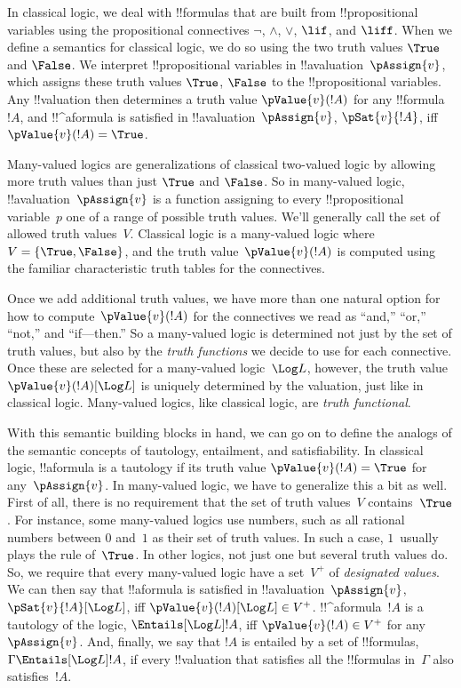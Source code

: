 \documentclass[../../../include/open-logic-section]{subfiles}
\begin{document}


In classical logic, we deal  with !!{formula}s that are built from
!!{propositional variable}s using the propositional connectives
$\lnot$, $\land$, $\lor$, $\lif$, and $\liff$.  When we define a
semantics for classical logic, we do so using the two truth values
$\True$ and $\False$.  We interpret !!{propositional variable}s in
!!a{valuation}~$\pAssign{v}$, which assigns these truth values
$\True$, $\False$ to the !!{propositional variable}s. Any
!!{valuation} then determines a truth value $\pValue{v}(!A)$ for any
!!{formula}~$!A$, and !!^a{formula} is satisfied in
!!a{valuation}~$\pAssign{v}$, $\pSat{v}{!A}$, iff $\pValue{v}(!A) =
\True$.

Many-valued logics are generalizations of classical two-valued logic
by allowing more truth values than just $\True$ and $\False$. So in
many-valued logic, !!a{valuation}~$\pAssign{v}$ is a function
assigning to every !!{propositional variable}~$p$ one of a range of
possible truth values.  We'll generally call the set of allowed truth
values~$V$.  Classical logic is a many-valued logic where $V =
\{\True, \False\}$, and the truth value~$\pValue{v}(!A)$ is computed
using the familiar characteristic truth tables for the connectives.

Once we add additional truth values, we have more than one natural
option for how to compute~$\pValue{v}(!A)$ for the connectives we read
as ``and,'' ``or,'' ``not,'' and ``if---then.''  So a many-valued
logic is determined not just by the set of truth values, but also by
the \emph{truth functions} we decide to use for each connective.  Once
these are selected for a many-valued logic~$\Log L$, however, the
truth value $\pValue{v}(!A)[\Log L]$ is uniquely determined by the
valuation, just like in classical logic. Many-valued logics, like
classical logic, are \emph{truth functional}.

With this semantic building blocks in hand, we can go on to define the
analogs of the semantic concepts of tautology, entailment, and
satisfiability.  In classical logic, !!a{formula} is a tautology if
its truth value $\pValue{v}(!A) = \True$ for any~$\pAssign{v}$.  In
many-valued logic, we have to generalize this a bit as well. First of
all, there is no requirement that the set of truth values~$V$
contains~$\True$. For instance, some many-valued logics use numbers,
such as all rational numbers between $0$ and~$1$ as their set of truth
values.  In such a case, $1$~usually plays the rule of~$\True$. In
other logics, not just one but several truth values do.  So, we
require that every many-valued logic have a set~$V^+$ of
\emph{designated values}.  We can then say that !!a{formula} is
satisfied in !!a{valuation}~$\pAssign{v}$, $\pSat{v}{!A}[\Log L]$, iff
$\pValue{v}(!A)[\Log L] \in V^+$. !!^a{formula}~$!A$ is a tautology of the
logic, $\Entails[\Log L] !A$, iff $\pValue{v}(!A) \in V^+$ for
any~$\pAssign{v}$. And, finally, we say that $!A$ is entailed by a set
of !!{formula}s, $\Gamma \Entails[\Log L] !A$, if every !!{valuation} that
satisfies all the !!{formula}s in~$\Gamma$ also satisfies~$!A$.
\end{document}
